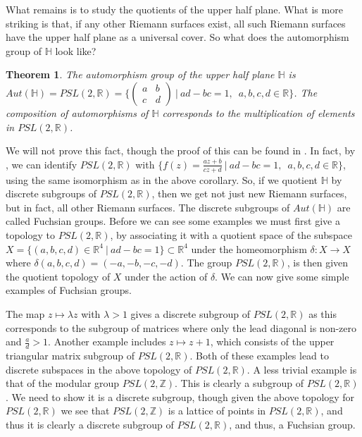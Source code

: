 \documentclass[11pt]{report}
\newtheorem{thm}{Theorem}[section]
\theoremstyle{definition}
\begin{document}
What remains is to study the quotients of the upper half plane. What is more striking is that, if any other Riemann surfaces exist, all such Riemann surfaces have the upper half plane as a universal cover. So what does the automorphism group of $\mathbb{H}$ look like?
\begin{thm}
  The automorphism group of the upper half plane $\mathbb{H}$ is ~\\ $Aut(\mathbb{H})=PSL(2,\mathbb{R}) = \Bigg\{ \begin{pmatrix} a & b\\ c & d \end{pmatrix} \ \Bigg\vert \ ad-bc = 1, \enspace a, b, c ,d \in \mathbb{\mathbb{R}}\Bigg\}$. The composition of automorphisms of $\mathbb{H}$ corresponds to the multiplication of elements in $PSL(2,\mathbb{R})$.
\end{thm} 
We will not prove this fact, though the proof of this can be found in \cite[Theorem 4.17.3 (iii)]{comfun}. In fact, by \cite[Theorem 2.9.1]{comfun}, we can identify $PSL(2,\mathbb{R})$ with $\bigl\{f(z) = \frac{az+b}{cz+d}\ \vert \ ad-bc = 1, \enspace a, b, c ,d \in \mathbb{R}\bigr\}$, using the same isomorphism as in the above corollary. So, if we quotient $\mathbb{H}$ by discrete subgroups of $PSL(2,\mathbb{R})$, then we get not just new Riemann surfaces, but in fact, all other Riemann surfaces. The discrete subgroups of $Aut(\mathbb{H})$ are called Fuchsian groups. Before we can see some examples we must first give a topology to $PSL(2,\mathbb{R})$, by associating it with a quotient space of the subspace $X = \{(a, b, c, d) \in \mathbb{R}^4 \ \vert \ ad-bc=1 \} \subset \mathbb{R}^4$ under the homeomorphism $\delta: X \rightarrow X$ where $\delta(a, b, c, d) = (-a, -b, -c, -d)$. The group $PSL(2,\mathbb{R})$, is then given the quotient topology of $X$ under the action of $\delta$.
We can now give some simple examples of Fuchsian groups. 

The map $z \mapsto \lambda z$ with $\lambda > 1$ gives a discrete subgroup of $PSL(2,\mathbb{R})$ as this corresponds to the subgroup of matrices where only the lead diagonal is non-zero and $\frac{a}{d} >1$. Another example includes $z \mapsto z + 1$, which consists of the upper triangular matrix subgroup of $PSL(2,\mathbb{R})$. Both of these examples lead to discrete subspaces in the above topology of $PSL(2,\mathbb{R})$. A less trivial example is that of the modular group $PSL(2,\mathbb{Z})$. This is clearly a subgroup of $PSL(2,\mathbb{R})$. We need to show it is a discrete subgroup, though given the above topology for $PSL(2,\mathbb{R})$ we see that $PSL(2,\mathbb{Z})$ is a lattice of points in $PSL(2,\mathbb{R})$, and thus it is clearly a discrete subgroup of $PSL(2,\mathbb{R})$, and thus, a Fuchsian group.
\end{document}
